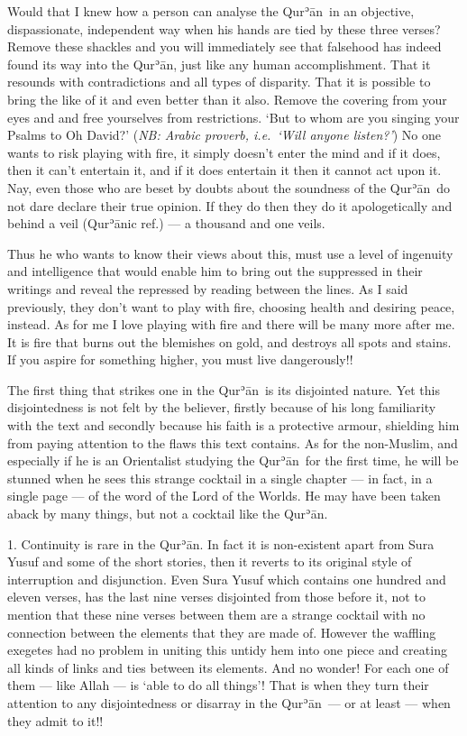 \documentclass[12pt]{memoir}
\def\´{ʾ} %
\newcommand{\ar}[1]{\RL{\arabicfont#1}}
\def \Quran{Qur\-\´ān} %
\def\–{-\hskip0pt}
\def\pardivider{\centerline{\ar{۞۞۞}}} %
\newcommand{\NB}[1]{\emph{\small NB: #1}}
\begin{document}
Would that I knew how a person can analyse the \Quran\ in an objective,
dispassionate, independent way when his hands are tied by these three verses?
Remove these shackles and you will immediately see that falsehood
has indeed found its way into the \Quran,
just like any human accomplishment.
That it resounds with contradictions and all types of disparity.
That it is possible to bring the like of it and even better than it also.
Remove the covering from your eyes and and free yourselves from restrictions.
‘But to whom are you singing your Psalms to Oh David?’
(\NB{Arabic proverb, i.e.\ ‘Will anyone listen?’})
No one wants to risk playing with fire,
it simply doesn’t enter the mind and if it does,
then it can’t entertain it, and if it does entertain it
then it cannot act upon it.
Nay, even those who are beset by doubts about the soundness of the \Quran\
do not dare declare their true opinion.
If they do then they do it apologetically and behind a veil (\Quran{}ic ref.) —
a thousand and one veils.

Thus he who wants to know their views about this,
must use a level of ingenuity and intelligence
that would enable him to bring out the suppressed in their writings
and reveal the repressed by reading between the lines.
As I said previously, they don’t want to play with fire,
choosing health and desiring peace, instead.
As for me I love playing with fire and there will be many more after me.
It is fire that burns out the blemishes on gold,
and destroys all spots and stains.
If you aspire for something higher, you must live dangerously!!

\pardivider

The first thing that strikes one in the \Quran\ is its disjointed nature.
Yet this disjointedness is not felt by the believer,
firstly because of his long familiarity with the text and secondly
because his faith is a protective armour,
shielding him from paying attention to the flaws this text contains.
As for the non\–Muslim, and especially if he is an Orientalist
studying the \Quran\ for the first time,
he will be stunned when he sees this strange cocktail in a single chapter —
in fact, in a single page — of the word of the Lord of the Worlds.
He may have been taken aback by many things,
but not a cocktail like the \Quran.

1. Continuity is rare in the \Quran.
In fact it is non\–existent apart from Sura Yusuf
and some of the short stories,
then it reverts to its original style of interruption and disjunction.
Even Sura Yusuf which contains one hundred and eleven verses,
has the last nine verses disjointed from those before it,
not to mention that these nine verses between them are a strange cocktail
with no connection between the elements that they are made of.
However the waffling exegetes had no problem in uniting this untidy hem
into one piece and creating all kinds of links and ties between its elements.
And no wonder! For each one of them — like Allah — is ‘able to do all things’!
That is when they turn their attention to any disjointedness
or disarray in the \Quran\ — or at least — when they admit to it!!
\end{document}
